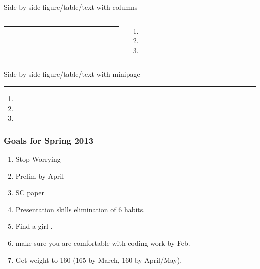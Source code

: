 \begin{frame}{Side-by-side figure/table/text with columns}
      \begin{columns}
            \begin{column}[C]{.45\textwidth}
                 \rule{\textwidth}{0.75\textwidth}
             \end{column}
           \begin{column}[C]{.45\textwidth}
                 \begin{enumerate} %
                      \item
                       \item
                       \item
                   \end{enumerate}
              \end{column}
        \end{columns}
  \end{frame}

\begin{frame}{Side-by-side figure/table/text with minipage}
  \begin{minipage}{0.45\textwidth} %
    \rule{\textwidth}{0.75\textwidth}
    \end{minipage}
  \qquad
  \begin{minipage}{0.45\textwidth}
    \begin{enumerate} %
      \item
        \item
          \item
            \end{enumerate}
    \end{minipage}
\end{frame}


\begin{frame}  
\frametitle{Goals for Spring 2013 }
\begin{enumerate} 
\item \tiny Stop Worrying
\item \tiny Prelim by April
\item \tiny SC paper 
\item \tiny Presentation skills elimination of 6 habits. 
\item \tiny Find a girl . 
\item \tiny make sure you are comfortable with coding work by Feb. 
\item \tiny Get weight to 160 (165 by March, 160 by April/May). 
\end{enumerate} 
\end{frame}

